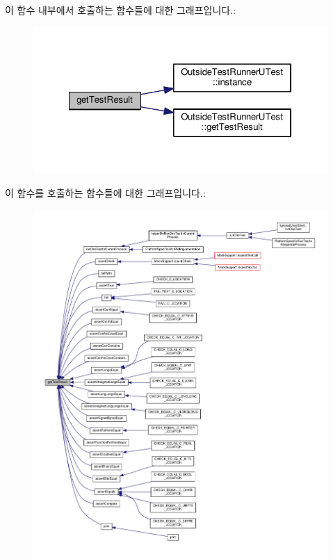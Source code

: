 이 함수 내부에서 호출하는 함수들에 대한 그래프입니다.\+:
\nopagebreak
\begin{figure}[H]
\begin{center}
\leavevmode
\includegraphics[width=322pt]{class_utest_shell_a34c525b685e30431750d9e355fdfff0c_cgraph}
\end{center}
\end{figure}




이 함수를 호출하는 함수들에 대한 그래프입니다.\+:
\nopagebreak
\begin{figure}[H]
\begin{center}
\leavevmode
\includegraphics[width=350pt]{class_utest_shell_a34c525b685e30431750d9e355fdfff0c_icgraph}
\end{center}
\end{figure}


